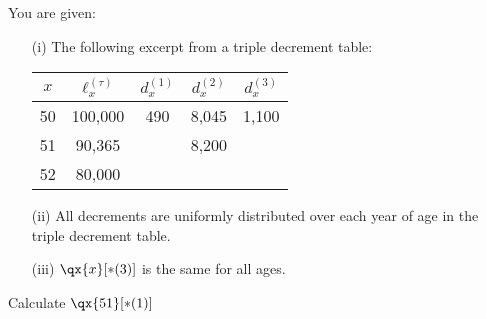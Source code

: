 You are given:
\begin{itemize}
\item[(i)] The following excerpt from a triple decrement table:
\begin{center}\begin{tabular}{ccccc}
 $x$ & $\ell_x^{(\tau)}$ &  $d_x^{(1)}$  &  $d_x^{(2)}$  &  $d_x^{(3)}$   \\ \hline 
50 & 100,000 & 490 & 8,045 & 1,100 \\ 
51 & 90,365   &        & 8,200 & \\
52 & 80,000
\end{tabular}\end{center}
\item[(ii)] All decrements are uniformly distributed over each year of age in the triple decrement table.
\item[(iii)] $\qx{x}[*(3)]$ is the same for all ages.
\end{itemize}
Calculate $\qx{51}[*(1)]$ 
